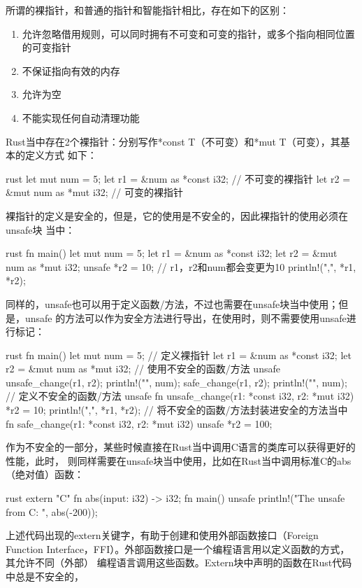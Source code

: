 所谓的裸指针，和普通的指针和智能指针相比，存在如下的区别：
\begin{enumerate}
  \item 允许忽略借用规则，可以同时拥有不可变和可变的指针，或多个指向相同位置的可变指针
  \item 不保证指向有效的内存
  \item 允许为空
  \item 不能实现任何自动清理功能
\end{enumerate}
Rust当中存在2个裸指针：分别写作*const T（不可变）和*mut T（可变），其基本的定义方式
如下：
\begin{code-block}{rust}
let mut num = 5;
let r1 = &num as *const i32; // 不可变的裸指针
let r2 = &mut num as *mut i32; // 可变的裸指针
\end{code-block}

裸指针的定义是安全的，但是，它的使用是不安全的，因此裸指针的使用必须在unsafe块
当中：
\begin{code-block}{rust}
fn main() {
    let mut num = 5;
    let r1 = &num as *const i32;
    let r2 = &mut num as *mut i32;
    unsafe {
        *r2 = 10;
        // r1，r2和num都会变更为10
        println!("{},{}", *r1, *r2);
    }
}
\end{code-block}
同样的，unsafe也可以用于定义函数/方法，不过也需要在unsafe块当中使用；但是，unsafe
的方法可以作为安全方法进行导出，在使用时，则不需要使用unsafe进行标记：
\begin{code-block}{rust}
fn main() {
    let mut num = 5;
    // 定义裸指针
    let r1 = &num as *const i32;
    let r2 = &mut num as *mut i32;
    // 使用不安全的函数/方法
    unsafe {
        unsafe_change(r1, r2);
    }
    println!("{}", num);
    safe_change(r1, r2);
    println!("{}", num);
}
// 定义不安全的函数/方法
unsafe fn unsafe_change(r1: *const i32, r2: *mut i32) {
    *r2 = 10;
    println!("{},{}", *r1, *r2);
}
// 将不安全的函数/方法封装进安全的方法当中
fn safe_change(r1: *const i32, r2: *mut i32) {
    unsafe {
        *r2 = 100;
    }
}
\end{code-block}

作为不安全的一部分，某些时候直接在Rust当中调用C语言的类库可以获得更好的性能，此时，
则同样需要在unsafe块当中使用，比如在Rust当中调用标准C的abs（绝对值）函数：
\begin{code-block}{rust}
extern "C" {
    fn abs(input: i32) -> i32;
}
fn main() {
    unsafe {
        println!("The unsafe from C: {}", abs(-200));
    }
}
\end{code-block}
上述代码出现的extern关键字，有助于创建和使用外部函数接口（Foreign Function
Interface，FFI）。外部函数接口是一个编程语言用以定义函数的方式，其允许不同（外部）
编程语言调用这些函数。Extern块中声明的函数在Rust代码中总是不安全的，

